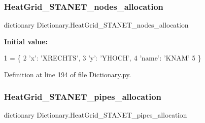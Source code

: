 \subsubsection{\texorpdfstring{Heat\+Grid\+\_\+\+S\+T\+A\+N\+E\+T\+\_\+nodes\+\_\+allocation}{HeatGrid\_STANET\_nodes\_allocation}}
{\footnotesize\ttfamily dictionary Dictionary.\+Heat\+Grid\+\_\+\+S\+T\+A\+N\+E\+T\+\_\+nodes\+\_\+allocation}

{\bfseries Initial value\+:}
\begin{DoxyCode}
1 =  \{
2                                 \textcolor{stringliteral}{'x'}: \textcolor{stringliteral}{'XRECHTS'},
3                                 \textcolor{stringliteral}{'y'}: \textcolor{stringliteral}{'YHOCH'},
4                                 \textcolor{stringliteral}{'name'}: \textcolor{stringliteral}{'KNAM'}
5                                 \}
\end{DoxyCode}


Definition at line 194 of file Dictionary.\+py.

\mbox{\label{namespace_dictionary_a7c7183d62ec27e3eabf3fa48e77d7cba}} 
\subsubsection{\texorpdfstring{Heat\+Grid\+\_\+\+S\+T\+A\+N\+E\+T\+\_\+pipes\+\_\+allocation}{HeatGrid\_STANET\_pipes\_allocation}}
{\footnotesize\ttfamily dictionary Dictionary.\+Heat\+Grid\+\_\+\+S\+T\+A\+N\+E\+T\+\_\+pipes\+\_\+allocation}

